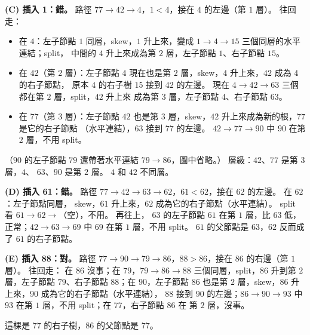 \begin{pastsoln}
\textbf{(C) 插入 1：錯。} 路徑 $77 \to 42 \to 4$，$1 < 4$，接在 $4$ 的左邊（第 $1$ 層）。 往回走：
\begin{itemize}
\item 在 $4$：左子節點 $1$ 同層，skew，$1$ 升上來，變成 $1 \to 4 \to 15$ 三個同層的水平連結；split，
中間的 $4$ 升上來成為第 $2$ 層，左子節點 $1$、右子節點 $15$。
\item 在 $42$（第 $2$ 層）：左子節點 $4$ 現在也是第 $2$ 層，skew，$4$ 升上來，$42$ 成為 $4$ 的右子節點，
原本 $4$ 的右子樹 $15$ 接到 $42$ 的左邊。 現在 $4 \to 42 \to 63$ 三個都在第 $2$ 層，split，$42$ 升上來
成為第 $3$ 層，左子節點 $4$、右子節點 $63$。
\item 在 $77$（第 $3$ 層）：左子節點 $42$ 也是第 $3$ 層，skew，$42$ 升上來成為新的根，$77$ 是它的右子節點
（水平連結），$63$ 接到 $77$ 的左邊。 $42 \to 77 \to 90$ 中 $90$ 在第 $2$ 層，不用 split。
\end{itemize}
\begin{center}
\end{center}
（$90$ 的左子節點 $79$ 還帶著水平連結 $79 \to 86$，圖中省略。） 層級：$42$、$77$ 是第 $3$ 層，$4$、
$63$、$90$ 是第 $2$ 層。 $4$ 和 $42$ 不同層。

\textbf{(D) 插入 61：錯。} 路徑 $77 \to 42 \to 63 \to 62$，$61 < 62$，接在 $62$ 的左邊。 在 $62$：左子節點同層，
skew，$61$ 升上來，$62$ 成為它的右子節點（水平連結）。 split 看 $61 \to 62 \to$（空），不用。 再往上，
$63$ 的左子節點 $61$ 在第 $1$ 層，比 $63$ 低，正常；$42 \to 63 \to 69$ 中 $69$ 在第 $1$ 層，不用 split。
$61$ 的父節點是 $63$，$62$ 反而成了 $61$ 的右子節點。

\textbf{(E) 插入 88：對。} 路徑 $77 \to 90 \to 79 \to 86$，$88 > 86$，接在 $86$ 的右邊（第 $1$ 層）。 往回走：
在 $86$ 沒事；在 $79$，$79 \to 86 \to 88$ 三個同層，split，$86$ 升到第 $2$ 層，左子節點 $79$、右子節點
$88$；在 $90$，左子節點 $86$ 也是第 $2$ 層，skew，$86$ 升上來，$90$ 成為它的右子節點（水平連結），
$88$ 接到 $90$ 的左邊；$86 \to 90 \to 93$ 中 $93$ 在第 $1$ 層，不用 split；在 $77$，右子節點 $86$ 在
第 $2$ 層，沒事。
\begin{center}
\end{center}
這棵是 $77$ 的右子樹，$86$ 的父節點是 $77$。
\end{pastsoln}
